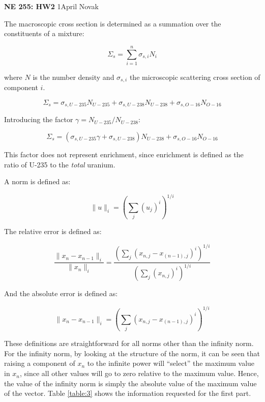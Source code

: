 \documentclass[10pt]{article}
\newcommand*\circled[1]{\tikz[baseline=(char.base)]{
            \node[shape=circle,draw,inner sep=2pt] (char) {#1};}}
\begin{document}
\textbf{NE 255: HW2} 1\hfill April Novak\newline

\circled{1}\newline

The macroscopic cross section is determined as a summation over the constituents of a mixture:

\begin{equation}
\Sigma_s=\sum_{i=1}^{n}\sigma_{s,i}N_i
\end{equation}

where \(N\) is the number density and \(\sigma_{s,i}\) the microscopic scattering cross section of component \(i\).

\begin{equation}
\Sigma_s=\sigma_{s, U-235}N_{U-235}+\sigma_{s,U-238}N_{U-238}+\sigma_{s,O-16}N_{O-16}
\end{equation}

Introducing the factor \(\gamma=N_{U-235}/N_{U-238}\):

\begin{equation}
\Sigma_s=(\sigma_{s, U-235}\gamma+ \sigma_{s,U-238})N_{U-238}+\sigma_{s,O-16}N_{O-16}
\end{equation}

This factor does not represent enrichment, since enrichment is defined as the ratio of U-235 to the \textit{total} uranium. 

\circled{3}\newline

A norm is defined as:

\begin{equation}
\|u\|_i=\left(\sum_{j}^{}(u_j)^i\right)^{1/i}
\end{equation}

The relative error is defined as:

\begin{equation}
\frac{\|x_n-x_{n-1}\|_i}{\|x_n\|_i}=\frac{\left(\sum_{j}^{}(x_{n,j}-x_{(n-1),j})^i\right)^{1/i}}{\left(\sum_{j}^{}(x_{n,j})^i\right)^{1/i}}
\end{equation}

And the absolute error is defined as:

\begin{equation}
\|x_n-x_{n-1}\|_i=\left(\sum_{j}^{}(x_{n,j}-x_{(n-1),j})^i\right)^{1/i}
\end{equation}

These definitions are straightforward for all norms other than the infinity norm. For the infinity norm, by looking at the structure of the norm, it can be seen that raising a component of \(x_n\) to the infinite power will ``select'' the maximum value in \(x_n\), since all other values will go to zero relative to the maximum value. Hence, the value of the infinity norm is simply the absolute value of the maximum value of the vector. Table \ref{table:3} shows the information requested for the first part. 
\end{document}

